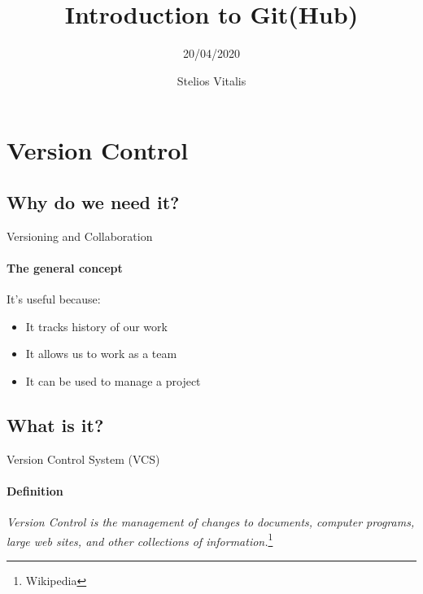 \documentclass{beamer}
\title{Introduction to Git(Hub)} %
\subtitle{20/04/2020} %
\author{Stelios Vitalis}
\begin{document}
  \frame{\maketitle}


	\section{Version Control}
\subsection{Why do we need it?}
\begin{frame}{Versioning and Collaboration}
\framesubtitle{The general concept}
It's useful because:
\begin{itemize}
	\item It tracks history of our work
	\item It allows us to work as a team
	\item It can be used to manage a project
\end{itemize}
\end{frame}


\subsection{What is it?}
\begin{frame}{Version Control System (VCS)}
\framesubtitle{Definition}

\begin{definition}
	\emph{Version Control is the \alert{management} of changes to documents, computer programs, large web sites, and other collections of information.}\footnote[frame]{Wikipedia}
\end{definition}
\end{frame}
\end{document}
